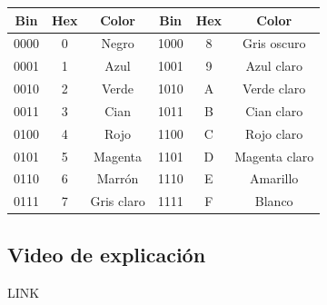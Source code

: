 \documentclass[10pt]{article}
\begin{document}
\begin{table}[H]
\centering
\renewcommand{\arraystretch}{1.2}
\begin{tabular}{|c|c|c|c|c|c|}
\hline
\textbf{Bin} & \textbf{Hex} & \textbf{Color} &
\textbf{Bin} & \textbf{Hex} & \textbf{Color} \\ \hline

0000 & 0 & Negro       & 1000 & 8 & Gris oscuro   \\ \hline
0001 & 1 & Azul        & 1001 & 9 & Azul claro    \\ \hline
0010 & 2 & Verde       & 1010 & A & Verde claro   \\ \hline
0011 & 3 & Cian        & 1011 & B & Cian claro    \\ \hline
0100 & 4 & Rojo        & 1100 & C & Rojo claro    \\ \hline
0101 & 5 & Magenta     & 1101 & D & Magenta claro \\ \hline
0110 & 6 & Marrón      & 1110 & E & Amarillo      \\ \hline
0111 & 7 & Gris claro  & 1111 & F & Blanco        \\ \hline

\end{tabular}
\end{table}

\subsection{Video de explicación}

LINK
\end{document}
